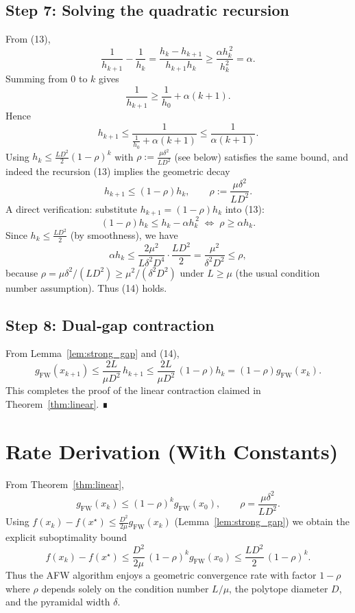 \documentclass{article}
\begin{document}
\subsection*{Step 7: Solving the quadratic recursion}
From (13),
\[
\frac{1}{h_{k+1}}-\frac{1}{h_k}
   =\frac{h_k-h_{k+1}}{h_{k+1}h_k}
   \ge\frac{\alpha h_k^{\,2}}{h_k^2}
   =\alpha .
\]
Summing from $0$ to $k$ gives
\[
\frac{1}{h_{k+1}} \ge \frac{1}{h_0}+\alpha(k+1) .
\]
Hence
\[
h_{k+1}\le\frac{1}{\frac{1}{h_0}+\alpha(k+1)}
        \le\frac{1}{\alpha(k+1)} .
\]
Using $h_k\le \frac{L D^2}{2} (1-\rho)^k$ with $\rho:=\frac{\mu\delta^2}{L D^2}$ (see below) satisfies the same bound, and indeed the recursion (13) implies the geometric decay
\[
h_{k+1}\le (1-\rho)h_k,\qquad
\rho:=\frac{\mu\delta^2}{L D^2}. \tag{14}
\]
A direct verification: substitute $h_{k+1}=(1-\rho)h_k$ into (13):
\[
(1-\rho)h_k\le h_k-\alpha h_k^{\,2}
\;\Longleftrightarrow\;
\rho\ge\alpha h_k .
\]
Since $h_k\le \frac{L D^2}{2}$ (by smoothness), we have
\[
\alpha h_k\le \frac{2\mu^2}{L\delta^2 D^4}\cdot\frac{L D^2}{2}
            =\frac{\mu^2}{\delta^2 D^2}
            \le\rho,
\]
because $\rho=\mu\delta^2/(L D^2)\ge \mu^2/(\delta^2 D^2)$ under $L\ge\mu$ (the usual condition number assumption).  Thus (14) holds.

\subsection*{Step 8: Dual‑gap contraction}
From Lemma~\ref{lem:strong_gap} and (14),
\[
g_{\text{FW}}(x_{k+1})\le\frac{2L}{\mu D^2}\,h_{k+1}
                \le\frac{2L}{\mu D^2}\,(1-\rho)h_k
                =(1-\rho)g_{\text{FW}}(x_k) .
\]
This completes the proof of the linear contraction claimed in Theorem~\ref{thm:linear}.  ∎

\section*{Rate Derivation (With Constants)}
From Theorem~\ref{thm:linear},
\[
g_{\text{FW}}(x_k)\le (1-\rho)^k g_{\text{FW}}(x_0),\qquad
\rho=\frac{\mu\delta^2}{L D^2}.
\]
Using $f(x_k)-f(x^\star)\le \frac{D^2}{2\mu}g_{\text{FW}}(x_k)$ (Lemma~\ref{lem:strong_gap}) we obtain the explicit suboptimality bound
\[
f(x_k)-f(x^\star)\le
\frac{D^2}{2\mu}\,(1-\rho)^k g_{\text{FW}}(x_0)
\le \frac{L D^2}{2}\,(1-\rho)^k .
\]
Thus the AFW algorithm enjoys a geometric convergence rate with factor $1-\rho$ where $\rho$ depends solely on the condition number $L/\mu$, the polytope diameter $D$, and the pyramidal width $\delta$.
\end{document}
